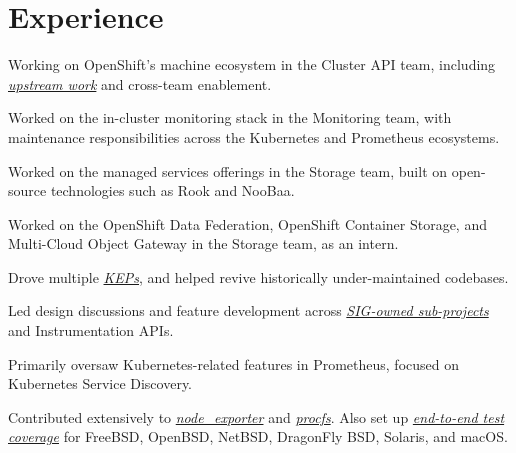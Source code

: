 \documentclass[]{rexagod-resume-openfont}
\begin{document}
\begin{minipage}[t]{0.66\textwidth} 


\section{Experience}

\vspace{\topsep}
\begin{tightemize}
\item Working on OpenShift's machine ecosystem in the Cluster API team, including \href{\capiUpstream}{\emph{upstream work}} and cross-team enablement.
\item Worked on the in-cluster monitoring stack in the Monitoring team, with maintenance responsibilities across the Kubernetes and Prometheus ecosystems.
\item Worked on the managed services offerings in the Storage team, built on open-source technologies such as Rook and NooBaa.
\item Worked on the OpenShift Data Federation, OpenShift Container Storage, and Multi-Cloud Object Gateway in the Storage team, as an intern.
\end{tightemize}
\sectionsep

\begin{tightemize}
\item Drove multiple \href{\keps}{\emph{KEPs}}, and helped revive historically under-maintained codebases.
\item Led design discussions and feature development across \href{\sigOwnedSubprojectsUrl}{\emph{SIG-owned sub-projects}} and Instrumentation APIs.
\end{tightemize}
\sectionsep

\begin{tightemize}
\item Primarily oversaw Kubernetes-related features in Prometheus, focused on Kubernetes Service Discovery.
\item Contributed extensively to \href{\nodeExporterUrl}{\emph{node\_exporter}} and \href{\procfsUrl}{\emph{procfs}}. Also set up \href{\nodeExporterBsdPrUrl}{\emph{end-to-end test coverage}} for FreeBSD, OpenBSD, NetBSD, DragonFly BSD, Solaris, and macOS.
\end{tightemize}
\sectionsep


\end{minipage}
\end{document}
